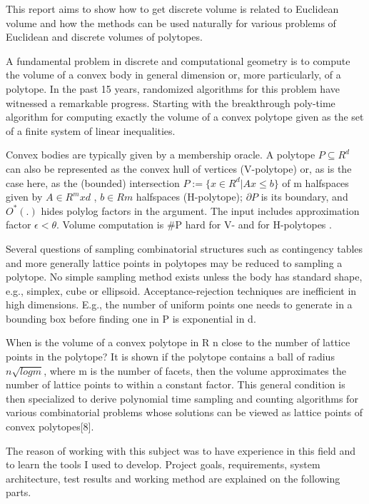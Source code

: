 \documentclass[12pt,twoside]{article}
\begin{document}
\par
This report aims to show how to get discrete volume is related to
Euclidean volume and how the methods can be used naturally for various problems
of Euclidean and discrete volumes of polytopes.\newline
\par 
A fundamental problem in discrete and computational geometry is to
compute the volume of a convex body in general dimension or, more particularly, of
a polytope. In the past 15 years, randomized algorithms for this problem have
witnessed a remarkable progress. Starting with the breakthrough poly-time
algorithm for computing exactly the volume of a convex polytope given as the set of a finite system of linear inequalities. \newline
\par
Convex bodies are typically given by a membership oracle. A polytope $P \subseteq R^d$ can also be represented as the convex hull of vertices (V-polytope) or, as is the
case here, as the (bounded) intersection $P := \{ x \in R^d | Ax \leq b\} $ of m halfspaces
given by $A \in R^mxd $ , $b \in R m$ halfspaces (H-polytope); $\partial P$ is its boundary, and
$O^* (.)$ hides polylog factors in the argument. The input includes approximation factor
$\epsilon < \theta$. Volume computation is \#P hard for V- and for H-polytopes \cite{computeVolume}.\newline
\par
Several questions of sampling combinatorial structures such as contingency
tables and more generally lattice points in polytopes may be reduced to sampling a
polytope. No simple sampling method exists unless the body has standard shape,
e.g., simplex, cube or ellipsoid. Acceptance-rejection techniques are inefficient in
high dimensions. E.g., the number of uniform points one needs to generate in a
bounding box before finding one in P is exponential in d.\newline
\par

When is the volume of a convex polytope in R n close to the number of lattice points
in the polytope? It is shown if the polytope contains a ball of radius $n\sqrt{logm}$, where m is the number of facets, then the volume approximates the number of lattice
points to within a constant factor. This general condition is then specialized to
derive polynomial time sampling and counting algorithms for various combinatorial
problems whose solutions can be viewed as lattice points of convex polytopes[8].\newline \newline
\par
The reason of working with this subject was to have experience in this field
and to learn the tools I used to develop. Project goals, requirements, system
architecture, test results and working method are explained on the following parts.
\end{document}

